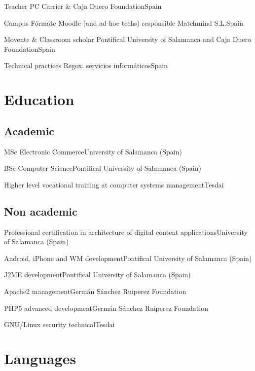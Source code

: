 \documentclass[11pt, a4paper, sans]{moderncv}
\begin{document}
{Teacher}
{PC Carrier \& Caja Duero Foundation}{Spain}{}{}

{Campus Fórmate Moodle (and ad-hoc techs) responsible}
{Matchmind S.L.}{Spain}{}{}

{Movente \& Classroom scholar}
{Pontifical University of Salamanca and Caja Duero Foundation}{Spain}{}{}

{Technical practices}
{Regox, servicios informáticos}{Spain}{}{}


%
%

\section{Education}
\subsection{Academic}
{MSc Electronic Commerce}{University of Salamanca (Spain)}{}{}{}

{BSc Computer Science}{Pontifical University of Salamanca (Spain)}{}{}{}

{Higher level vocational training at computer systems management}{Tesdai}{}{}{}

\subsection{Non academic}
{Professional certification in architecture of digital content applications}{University of Salamanca (Spain)}{}{}{}

{Android, iPhone and WM development}{Pontifical University of Salamanca (Spain)}{}{}{}

{J2ME development}{Pontifical University of Salamanca (Spain)}{}{}{}

{Apache2 management}{Germán Sánchez Ruiperez Foundation}{}{}{}

{PHP5 advanced development}{Germán Sánchez Ruiperez Foundation}{}{}{}

{GNU/Linux security technical}{Tesdai}{}{}{}

%
%

\section{Languages}
\end{document}
